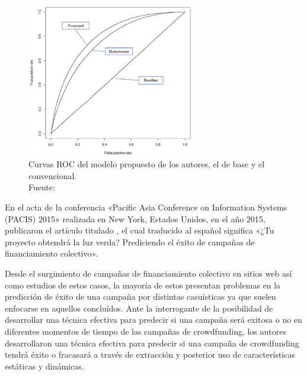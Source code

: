 \begin{figure}[!ht]
	\begin{center}
		\includegraphics[width=0.65\textwidth]{2/figures/zhou2015.jpg}
		\caption[Curvas ROC del modelo propuesto, el de base y el convencional]{Curvas ROC del modelo propuesto de los autores, el de base y el convencional.\\
			Fuente: \cite{pr_zhou2015projectdesc}}
		\label{2:fig113}
	\end{center}
\end{figure}

\clearpage
En el acta de la conferencia «Pacific Asia Conference on Information Systems (PACIS) 2015» realizada en New York, Estados Unidos, en el año 2015, \cite{pr_chen2015predcrowd} publicaron el artículo titulado , el cual traducido al español significa «¿Tu proyecto obtendrá la luz verda? Prediciendo el éxito de campañas de financiamiento colectivo».

Desde el surgimiento de campañas de financiamiento colectivo en sitios web así como estudios de estos casos, la mayoría de estos presentan problemas en la predicción de éxito de una campaña por distintas casuísticas ya que suelen enfocarse en aquellos concluídos. Ante la interrogante de la posibilidad de desarrollar una técnica efectiva para predecir si una campaña será exitosa o no en diferentes momentos de tiempo de las campañas de crowdfunding, los autores desarrollaron una técnica efectiva para predecir si una campaña de crowdfunding tendrá éxito o fracasará a través de extracción y posterior uso de características estáticas y dinámicas.


